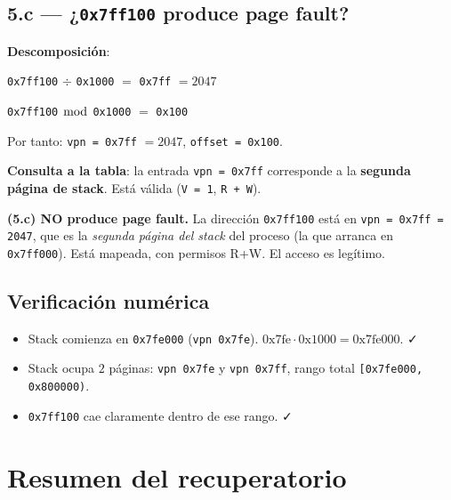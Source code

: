 \documentclass[11pt,a4paper]{article}
\begin{document}
\subsection*{5.c --- ¿\texttt{0x7ff100} produce page fault?}

\textbf{Descomposición}:

\quad \texttt{0x7ff100} $\div$ \texttt{0x1000} $= $ \texttt{0x7ff} $= 2047$

\quad \texttt{0x7ff100} $\bmod$ \texttt{0x1000} $= $ \texttt{0x100}

Por tanto: \texttt{vpn = 0x7ff} $= 2047$, \texttt{offset = 0x100}.

\textbf{Consulta a la tabla}: la entrada \texttt{vpn = 0x7ff}
corresponde a la \textbf{segunda página de stack}. Está válida
(\texttt{V = 1}, \texttt{R + W}).

\begin{respuesta}
\textbf{(5.c) NO produce page fault.} La dirección \texttt{0x7ff100}
está en \texttt{vpn = 0x7ff = 2047}, que es la \emph{segunda página
del stack} del proceso (la que arranca en \texttt{0x7ff000}). Está
mapeada, con permisos R+W. El acceso es legítimo.
\end{respuesta}

\subsection*{Verificación numérica}

\begin{itemize}[leftmargin=*,nosep]
    \item Stack comienza en \texttt{0x7fe000} (\texttt{vpn 0x7fe}).
        $0\text{x}7\text{fe} \cdot 0\text{x}1000 = 0\text{x}7\text{fe}000$. ✓
    \item Stack ocupa $2$ páginas: \texttt{vpn 0x7fe} y
        \texttt{vpn 0x7ff}, rango total
        \texttt{[0x7fe000, 0x800000)}.
    \item \texttt{0x7ff100} cae claramente dentro de ese rango. ✓
\end{itemize}

\section*{Resumen del recuperatorio}
\end{document}
